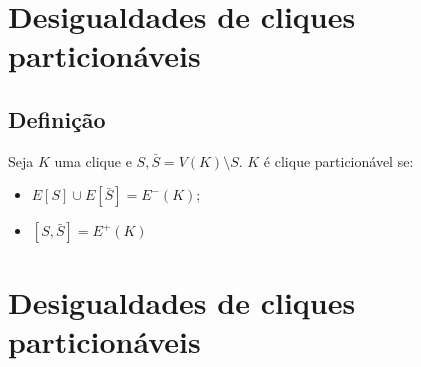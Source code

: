 \documentclass[
12pt,notheorems,hyperref={pdfauthor=whatever}
]{beamer}
\begin{document}
\section{Desigualdades de cliques particionáveis}
\subsection{Definição}
\begin{frame}
    
    \begin{definition}
        Seja $K$ uma clique e $S, \bar{S} = V(K)\setminus S$. $K$ é clique particionável se:
        
        \begin{itemize}
            \item $E[S] \cup E[\bar{S}] = E^-(K)$;
            \item $[S, \bar{S}] = E^+(K)$
        \end{itemize}
    \end{definition}

    \vspace{2em}
    \begin{minipage}[h][10em][c]{\textwidth}
		\centering%
		
        \vspace{1em}
		\small{}
	\end{minipage}
    
\end{frame}


\section{Desigualdades de cliques particionáveis}
\end{document}
